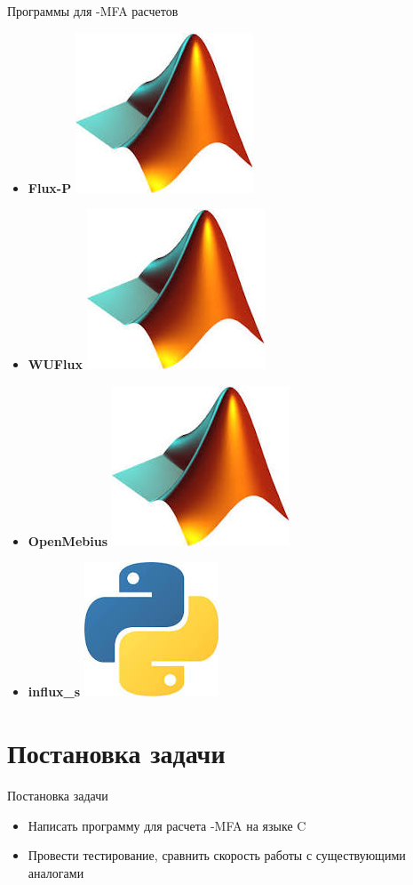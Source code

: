 \documentclass[aspectratio=169]{beamer}
\newcommand{\CC}{C\nolinebreak\hspace{-.05em}\raisebox{.4ex}{\tiny\bf +}\nolinebreak\hspace{-.10em}\raisebox{.4ex}{\tiny\bf +}}
\def\CC{{C\nolinebreak[4]\hspace{-.05em}\raisebox{.4ex}{\tiny\bf ++}}} %
\begin{document}
\begin{frame}{Программы для -MFA расчетов}
\begin{itemize}
		\item \textbf{Flux-P} \includegraphics[height=\fontcharht\font`\B]{matlab.jpeg}
		\item \textbf{WUFlux} \includegraphics[height=\fontcharht\font`\B]{matlab.jpeg}
		\item \textbf{OpenMebius} \includegraphics[height=\fontcharht\font`\B]{matlab.jpeg}
		\item \textbf{influx\_s} \includegraphics[height=\fontcharht\font`\B]{python.jpeg}
	\end{itemize}
\end{frame}

\section{Постановка задачи}
\begin{frame}{Постановка задачи}
	\begin{itemize}
		\item Написать программу для расчета -MFA на языке \CC{}
		\item Провести тестирование, сравнить скорость работы с существующими аналогами
	\end{itemize}
\end{frame}
\end{document}
